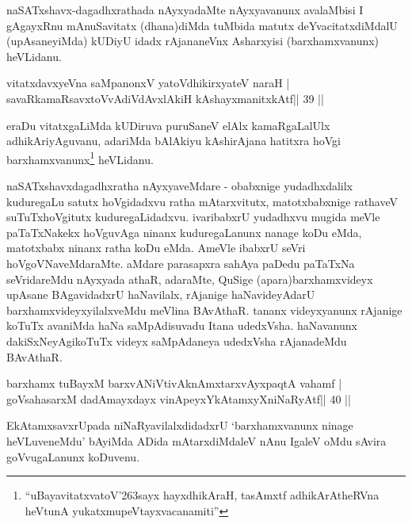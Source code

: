 \begin{artha}
naSATxshavx-dagadhxrathada nAyxyadaMte nAyxyavanunx avalaMbisi I gAgayxRnu mAnuSavitatx (dhana)diMda tuMbida matutx deYvacitatxdiMdalU (upAsaneyiMda) kUDiyU idadx rAjananeVnx Asharxyisi (barxhamxvanunx) heVLidanu.
\end{artha}


\begin{shl}
vitatxdavxyeVna saMpanonxV yatoV\s dhikirxyateV naraH |
savaRkamaRsavxtoV\s vAdiVdAvxlAkiH kAshayxmanitxkAtf\hfill || 39 ||
\end{shl}

\begin{artha}
eraDu vitatxgaLiMda kUDiruva puruSaneV elAlx kamaRgaLalUlx adhikAriyAguvanu, adariMda bAlAkiyu kAshirAjana hatitxra hoVgi barxhamxvanunx\footnote[8]{``uBayavitatxvatoV\char'263sayx hayxdhikAraH, tasAmxtf adhikArAtheRVna heVtunA yukatxmupeVtayxvacanamiti''} heVLidanu.
\end{artha}

\begin{artha}
naSATxshavxdagadhxratha nAyxyaveMdare - obabxnige yudadhxdalilx 
kuduregaLu satutx hoVgidadxvu ratha mAtarxvitutx, matotxbabxnige 
rathaveV suTuTxhoVgitutx kuduregaLidadxvu. ivaribabxrU yudadhxvu mugida 
meVle paTaTxNakekx hoVguvAga ninanx kuduregaLanunx nanage koDu eMda, 
matotxbabx ninanx ratha koDu eMda. AmeVle ibabxrU seVri 
hoVgoVNaveMdaraMte. aMdare parasapxra sahAya paDedu paTaTxNa 
seVridareMdu nAyxyada athaR, adaraMte, QuSige (apara)barxhamxvideyx upAsane BAgavidadxrU haNavilalx, rAjanige haNavideyAdarU barxhamxvideyxyilalxveMdu meVlina BAvAthaR. tananx videyxyanunx rAjanige koTuTx avaniMda haNa saMpAdisuvadu Itana udedxVsha. haNavanunx dakiSxNeyAgikoTuTx videyx saMpAdaneya udedxVsha rAjanadeMdu BAvAthaR.
\end{artha}


\begin{shl}
barxhamx tuBayxM barxvANiVtivAknAmxtarxvAyxpaqtA vahamf |
goVsahasarxM dadAmayxdayx vinApeyxYkAtamxyXniNaRyAtf\hfill || 40 ||
\end{shl}

\begin{artha}
EkAtamxsavxrUpada niNaRyavilalxdidadxrU `barxhamxvanunx ninage 
heVLuveneMdu' bAyiMda ADida mAtarxdiMdaleV nAnu IgaleV oMdu sAvira goVvugaLanunx koDuvenu.
\end{artha}

